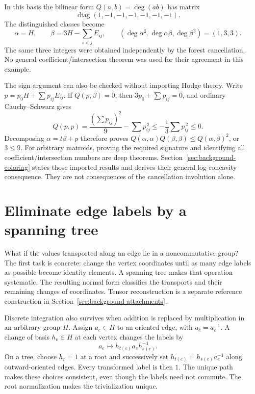 \documentclass[11pt]{article}
\theoremstyle{definition}
\theoremstyle{remark}
\begin{document}
In this basis the bilinear form $Q(a,b)=\deg(ab)$ has matrix
\[
 \operatorname{diag}(1,-1,-1,-1,-1,-1,-1).
\]
The distinguished classes become
\[
 \alpha=H,\qquad \beta=3H-\sum_{i<j}E_{ij},
 \qquad (\deg\alpha^2,\deg\alpha\beta,\deg\beta^2)=(1,3,3).
\]
The same three integers were obtained independently by the forest cancellation. No general coefficient/intersection theorem was used for their agreement in this example.

The sign argument can also be checked without importing Hodge theory. Write $p=p_0H+\sum p_{ij}E_{ij}$. If $Q(p,\beta)=0$, then $3p_0+\sum p_{ij}=0$, and ordinary Cauchy--Schwarz gives
\[
 Q(p,p)=\frac{(\sum p_{ij})^2}{9}-\sum p_{ij}^{\,2}
          \le-\frac13\sum p_{ij}^{\,2}\le0.
\]
Decomposing $\alpha=t\beta+p$ therefore proves
$Q(\alpha,\alpha)Q(\beta,\beta)\le Q(\alpha,\beta)^2$, or $3\le9$.
For arbitrary matroids, proving the required signature and identifying all coefficient/intersection numbers are deep theorems. Section~\ref{sec:background-coloring} states those imported results and derives their general log-concavity consequence. They are not consequences of the cancellation involution alone.

\section{Eliminate edge labels by a spanning tree}
\label{sec:transport}

What if the values transported along an edge lie in a noncommutative group? The first task is concrete: change the vertex coordinates until as many edge labels as possible become identity elements. A spanning tree makes that operation systematic. The resulting normal form classifies the transports and their remaining changes of coordinates. Tensor reconstruction is a separate reference construction in Section~\ref{sec:background-attachments}.

Discrete integration also survives when addition is replaced by multiplication in an arbitrary group \(H\). Assign \(a_e\in H\) to an oriented edge, with \(a_{\bar e}=a_e^{-1}\). A change of basis \(h_v\in H\) at each vertex changes the labels by
\[
 a_e\longmapsto h_{t(e)}a_eh_{s(e)}^{-1}.
\]
On a tree, choose \(h_r=1\) at a root and successively set
\(h_{t(e)}=h_{s(e)}a_e^{-1}\) along outward-oriented edges. Every transformed label is then \(1\). The unique path makes these choices consistent, even though the labels need not commute. The root normalization makes the trivialization unique.
\end{document}
